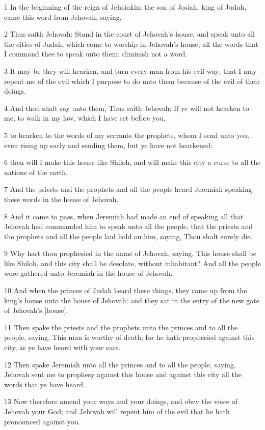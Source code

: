 \par 1 In the beginning of the reign of Jehoiakim the son of Josiah, king of Judah, came this word from Jehovah, saying,
\par 2 Thus saith Jehovah: Stand in the court of Jehovah's house, and speak unto all the cities of Judah, which come to worship in Jehovah's house, all the words that I command thee to speak unto them; diminish not a word.
\par 3 It may be they will hearken, and turn every man from his evil way; that I may repent me of the evil which I purpose to do unto them because of the evil of their doings.
\par 4 And thou shalt say unto them, Thus saith Jehovah: If ye will not hearken to me, to walk in my law, which I have set before you,
\par 5 to hearken to the words of my servants the prophets, whom I send unto you, even rising up early and sending them, but ye have not hearkened;
\par 6 then will I make this house like Shiloh, and will make this city a curse to all the nations of the earth.
\par 7 And the priests and the prophets and all the people heard Jeremiah speaking these words in the house of Jehovah.
\par 8 And it came to pass, when Jeremiah had made an end of speaking all that Jehovah had commanded him to speak unto all the people, that the priests and the prophets and all the people laid hold on him, saying, Thou shalt surely die.
\par 9 Why hast thou prophesied in the name of Jehovah, saying, This house shall be like Shiloh, and this city shall be desolate, without inhabitant? And all the people were gathered unto Jeremiah in the house of Jehovah.
\par 10 And when the princes of Judah heard these things, they came up from the king's house unto the house of Jehovah; and they sat in the entry of the new gate of Jehovah's [house].
\par 11 Then spake the priests and the prophets unto the princes and to all the people, saying, This man is worthy of death; for he hath prophesied against this city, as ye have heard with your ears.
\par 12 Then spake Jeremiah unto all the princes and to all the people, saying, Jehovah sent me to prophesy against this house and against this city all the words that ye have heard.
\par 13 Now therefore amend your ways and your doings, and obey the voice of Jehovah your God; and Jehovah will repent him of the evil that he hath pronounced against you.
